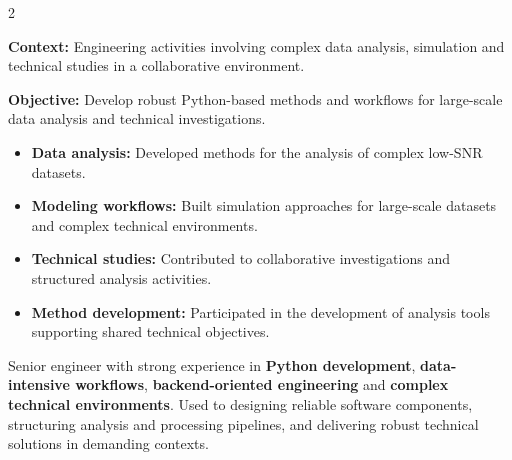 \documentclass[8pt,a4paper,ragged2e,withhyper]{altacv}
\begin{document}
\begin{paracol}{2}

\textbf{Context:} Engineering activities involving complex data analysis, simulation and technical studies in a collaborative environment.

\textbf{Objective:} Develop robust Python-based methods and workflows for large-scale data analysis and technical investigations.

\begin{itemize}
\item \textbf{Data analysis:} Developed methods for the analysis of complex low-SNR datasets.
\item \textbf{Modeling workflows:} Built simulation approaches for large-scale datasets and complex technical environments.
\item \textbf{Technical studies:} Contributed to collaborative investigations and structured analysis activities.
\item \textbf{Method development:} Participated in the development of analysis tools supporting shared technical objectives.
\end{itemize}




\switchcolumn

Senior engineer with strong experience in \textbf{Python development}, \textbf{data-intensive workflows}, \textbf{backend-oriented engineering} and \textbf{complex technical environments}. Used to designing reliable software components, structuring analysis and processing pipelines, and delivering robust technical solutions in demanding contexts.


\end{paracol}
\end{document}
